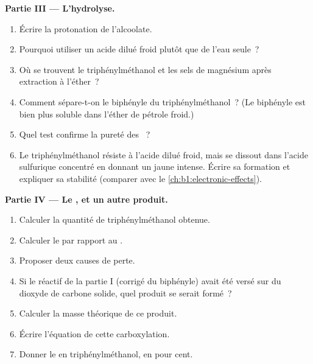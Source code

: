\begin{problem}
\medskip
\noindent\textbf{Partie III --- L'hydrolyse.}
\begin{enumerate}[resume]
  \item Écrire la protonation de l'alcoolate.
  \item Pourquoi utiliser un acide dilué froid plutôt que de l'eau
        seule~?
  \item Où se trouvent le triphénylméthanol et les sels de magnésium
        après extraction à l'éther~?
  \item Comment sépare-t-on le biphényle du triphénylméthanol~? (Le
        biphényle est bien plus soluble dans l'éther de pétrole froid.)
  \item Quel test confirme la pureté des ~?
  \item Le triphénylméthanol résiste à l'acide dilué froid, mais se
        dissout dans l'acide sulfurique concentré en donnant un
         jaune intense. Écrire sa formation et expliquer sa
        stabilité (comparer avec le \cref{ch:b1:electronic-effects}).
\end{enumerate}

\medskip
\noindent\textbf{Partie IV --- Le , et un autre produit.}
\begin{enumerate}[resume]
  \item Calculer la quantité de triphénylméthanol obtenue.
  \item Calculer le  par rapport au .
  \item Proposer deux causes de perte.
  \item Si le réactif de la partie I (corrigé du biphényle) avait été
        versé sur du dioxyde de carbone solide, quel produit se serait
        formé~?
  \item Calculer la masse théorique de ce produit.
  \item Écrire l'équation de cette carboxylation.
  \item Donner le  en triphénylméthanol, en pour cent.
\end{enumerate}
\end{problem}
